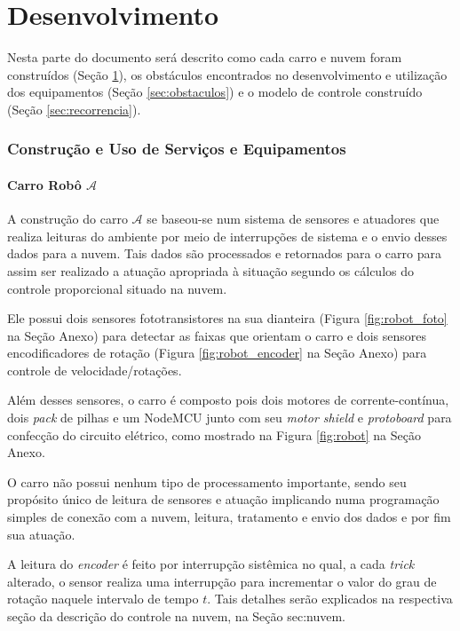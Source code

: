 \part{Desenvolvimento} \label{sec:parte2}

Nesta parte do documento será descrito como cada carro e nuvem foram construídos (Seção \ref{sec:construcao}), os obstáculos encontrados no desenvolvimento e utilização dos equipamentos (Seção \ref{sec:obstaculos}) e o modelo de controle construído (Seção \ref{sec:recorrencia}).

\section{Construção e Uso de Serviços e Equipamentos} \label{sec:construcao}

	\subsection{Carro Robô $ \mathcal{A} $}
		A construção do carro $ \mathcal{A} $ se baseou-se num sistema de sensores e atuadores que realiza leituras do ambiente por meio de interrupções de sistema e o envio desses dados para a nuvem. Tais dados são processados e retornados para o carro para assim ser realizado a atuação apropriada à situação segundo os cálculos do controle proporcional situado na nuvem.

		Ele possui dois sensores fototransistores na sua dianteira (Figura \ref{fig:robot_foto} na Seção Anexo) para detectar as faixas que orientam o carro e dois sensores encodificadores de rotação (Figura \ref{fig:robot_encoder} na Seção Anexo) para controle de velocidade/rotações.

		Além desses sensores, o carro é composto pois dois motores de corrente-contínua, dois \textit{pack} de pilhas e um NodeMCU junto com seu \textit{motor shield} e \textit{protoboard} para confecção do circuito elétrico, como mostrado na Figura \ref{fig:robot} na Seção Anexo.  
        

			O carro não possui nenhum tipo de processamento importante, sendo seu propósito único de leitura de sensores e atuação implicando numa programação simples de conexão com a nuvem, leitura, tratamento e envio dos dados e por fim sua atuação.

			A leitura do \textit{encoder} é feito por interrupção sistêmica no qual, a cada \textit{trick} alterado, o sensor realiza uma interrupção para incrementar o valor do grau de rotação naquele intervalo de tempo $t$. Tais detalhes serão explicados na respectiva seção da descrição do controle na nuvem, na Seção {sec:nuvem}.

